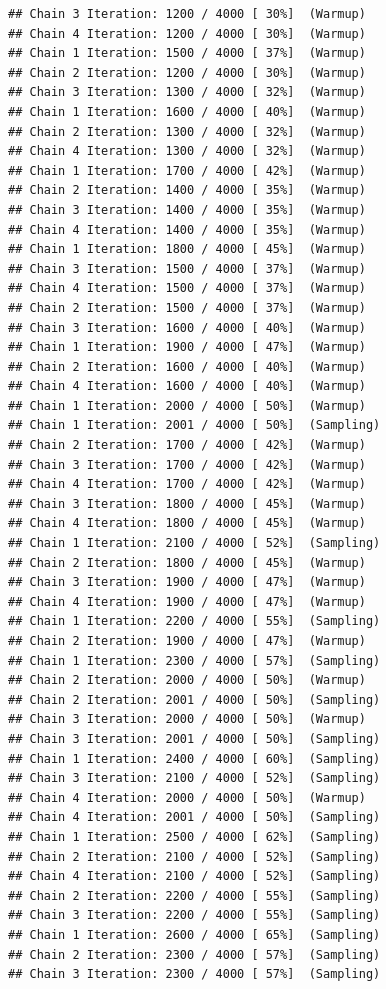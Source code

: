 \documentclass[
]{article}
\begin{document}
\begin{verbatim}
## Chain 3 Iteration: 1200 / 4000 [ 30%]  (Warmup) 
## Chain 4 Iteration: 1200 / 4000 [ 30%]  (Warmup) 
## Chain 1 Iteration: 1500 / 4000 [ 37%]  (Warmup) 
## Chain 2 Iteration: 1200 / 4000 [ 30%]  (Warmup) 
## Chain 3 Iteration: 1300 / 4000 [ 32%]  (Warmup) 
## Chain 1 Iteration: 1600 / 4000 [ 40%]  (Warmup) 
## Chain 2 Iteration: 1300 / 4000 [ 32%]  (Warmup) 
## Chain 4 Iteration: 1300 / 4000 [ 32%]  (Warmup) 
## Chain 1 Iteration: 1700 / 4000 [ 42%]  (Warmup) 
## Chain 2 Iteration: 1400 / 4000 [ 35%]  (Warmup) 
## Chain 3 Iteration: 1400 / 4000 [ 35%]  (Warmup) 
## Chain 4 Iteration: 1400 / 4000 [ 35%]  (Warmup) 
## Chain 1 Iteration: 1800 / 4000 [ 45%]  (Warmup) 
## Chain 3 Iteration: 1500 / 4000 [ 37%]  (Warmup) 
## Chain 4 Iteration: 1500 / 4000 [ 37%]  (Warmup) 
## Chain 2 Iteration: 1500 / 4000 [ 37%]  (Warmup) 
## Chain 3 Iteration: 1600 / 4000 [ 40%]  (Warmup) 
## Chain 1 Iteration: 1900 / 4000 [ 47%]  (Warmup) 
## Chain 2 Iteration: 1600 / 4000 [ 40%]  (Warmup) 
## Chain 4 Iteration: 1600 / 4000 [ 40%]  (Warmup) 
## Chain 1 Iteration: 2000 / 4000 [ 50%]  (Warmup) 
## Chain 1 Iteration: 2001 / 4000 [ 50%]  (Sampling) 
## Chain 2 Iteration: 1700 / 4000 [ 42%]  (Warmup) 
## Chain 3 Iteration: 1700 / 4000 [ 42%]  (Warmup) 
## Chain 4 Iteration: 1700 / 4000 [ 42%]  (Warmup) 
## Chain 3 Iteration: 1800 / 4000 [ 45%]  (Warmup) 
## Chain 4 Iteration: 1800 / 4000 [ 45%]  (Warmup) 
## Chain 1 Iteration: 2100 / 4000 [ 52%]  (Sampling) 
## Chain 2 Iteration: 1800 / 4000 [ 45%]  (Warmup) 
## Chain 3 Iteration: 1900 / 4000 [ 47%]  (Warmup) 
## Chain 4 Iteration: 1900 / 4000 [ 47%]  (Warmup) 
## Chain 1 Iteration: 2200 / 4000 [ 55%]  (Sampling) 
## Chain 2 Iteration: 1900 / 4000 [ 47%]  (Warmup) 
## Chain 1 Iteration: 2300 / 4000 [ 57%]  (Sampling) 
## Chain 2 Iteration: 2000 / 4000 [ 50%]  (Warmup) 
## Chain 2 Iteration: 2001 / 4000 [ 50%]  (Sampling) 
## Chain 3 Iteration: 2000 / 4000 [ 50%]  (Warmup) 
## Chain 3 Iteration: 2001 / 4000 [ 50%]  (Sampling) 
## Chain 1 Iteration: 2400 / 4000 [ 60%]  (Sampling) 
## Chain 3 Iteration: 2100 / 4000 [ 52%]  (Sampling) 
## Chain 4 Iteration: 2000 / 4000 [ 50%]  (Warmup) 
## Chain 4 Iteration: 2001 / 4000 [ 50%]  (Sampling) 
## Chain 1 Iteration: 2500 / 4000 [ 62%]  (Sampling) 
## Chain 2 Iteration: 2100 / 4000 [ 52%]  (Sampling) 
## Chain 4 Iteration: 2100 / 4000 [ 52%]  (Sampling) 
## Chain 2 Iteration: 2200 / 4000 [ 55%]  (Sampling) 
## Chain 3 Iteration: 2200 / 4000 [ 55%]  (Sampling) 
## Chain 1 Iteration: 2600 / 4000 [ 65%]  (Sampling) 
## Chain 2 Iteration: 2300 / 4000 [ 57%]  (Sampling) 
## Chain 3 Iteration: 2300 / 4000 [ 57%]  (Sampling) 

\end{verbatim}
\end{document}
